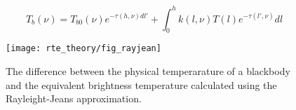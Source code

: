  \begin{equation}
   T_b(\nu) = T_{b0}(\nu)e^{-\tau(h,\nu)dl'} + 
     \int^h_0{k(l,\nu)T(l) e^{-\tau(l',\nu)} dl}
  \label{eq:rtetheory:rte_tb}
 \end{equation}  

 \begin{figure}
  \begin{center}
    \texttt{[image: rte\_theory/fig\_rayjean]}
    \caption{The difference between the physical temperarature of a 
             blackbody and the equivalent brightness temperature
             calculated using the Rayleight-Jeans approximation.}
    \label{fig:rtetheory:rayjean}
  \end{center}
 \end{figure}   
